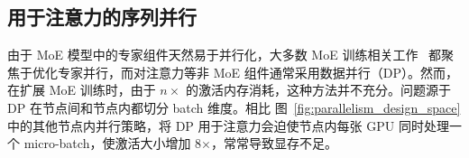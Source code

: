 
\subsection{用于注意力的序列并行}
\label{sec:design:parallelism:sp_attention}

由于 MoE 模型中的专家组件天然易于并行化，大多数 MoE 训练相关工作~\cite{rajbhandari2022deepspeed, li2023accelerating} 都聚焦于优化专家并行，而对注意力等非 MoE 组件通常采用数据并行（DP）。然而，在扩展 MoE 训练时，由于 $n \times$ 的激活内存消耗，这种方法并不充分。问题源于 DP 在节点间和节点内都切分 batch 维度。相比 图~\ref{fig:parallelism_design_space} 中的其他节点内并行策略，将 DP 用于注意力会迫使节点内每张 GPU 同时处理一个 micro-batch，使激活大小增加 8$\times$，常常导致显存不足。


